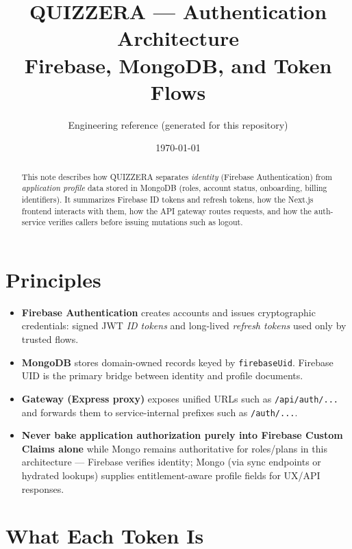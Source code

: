 \documentclass[11pt,a4paper]{article}
\title{\textbf{QUIZZERA} --- Authentication Architecture\\
\large Firebase, MongoDB, and Token Flows}
\author{Engineering reference (generated for this repository)}
\date{\today}
\begin{document}
\maketitle
\tableofcontents
\vspace{1em}

\begin{abstract}
\noindent
This note describes how QUIZZERA separates \emph{identity} (Firebase Authentication)
from \emph{application profile} data stored in MongoDB (roles, account status,
onboarding, billing identifiers). It summarizes Firebase ID tokens and refresh tokens,
how the Next.js frontend interacts with them, how the API gateway routes requests,
and how the auth-service verifies callers before issuing mutations such as logout.
\end{abstract}

\section{Principles}

\begin{itemize}[leftmargin=*]
  \item \textbf{Firebase Authentication} creates accounts and issues cryptographic credentials:
        signed JWT \emph{ID tokens} and long-lived \emph{refresh tokens} used only by trusted flows.
  \item \textbf{MongoDB} stores domain-owned records keyed by \texttt{firebaseUid}.
        Firebase UID is the primary bridge between identity and profile documents.
  \item \textbf{Gateway (Express proxy)} exposes unified URLs such as
        \texttt{/api/auth/...} and forwards them to service-internal prefixes such as \texttt{/auth/...}.
  \item \textbf{Never bake application authorization purely into Firebase Custom Claims alone}
        while Mongo remains authoritative for roles/plans in this architecture --- Firebase verifies identity;
        Mongo (via sync endpoints or hydrated lookups) supplies entitlement-aware profile fields for UX/API responses.
\end{itemize}

\section{What Each Token Is}
\end{document}
